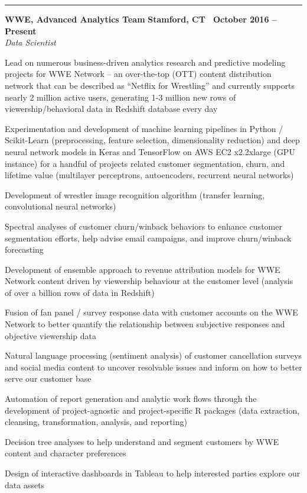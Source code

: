 \documentclass[10pt]{article}
\newcommand{\ressection}[1]{\noindent{\large\textbf{#1}}
\vspace{2pt}\hrule\vspace{4pt}}
\newcommand{\leftandright}[2]{\noindent\textbf{#1}\hfill
\textbf{#2}}
\begin{document}
\vspace{0.2cm}
\ressection{Work and Professional Research Experience}

\leftandright{WWE, Advanced Analytics Team}{Stamford, CT \textbullet\, October
2016 -- Present} \\  
\vspace{-0.8em}
\textit{Data Scientist} 
\begin{itemize*}
  \item Lead on numerous business-driven analytics research and
    predictive modeling projects for WWE Network -- an
    over-the-top (OTT) content distribution network  that can be
    described as ``Netflix for Wrestling'' and currently supports nearly
    2 million active users, generating 1-3 million new rows of viewership/behavioral 
    data in Redshift database every day
  \item Experimentation and development of machine learning pipelines
    in Python / Scikit-Learn (preprocessing, feature selection, dimensionality reduction) and 
    deep neural network models in Keras and TensorFlow 
    on AWS EC2 x2.2xlarge (GPU instance) for a handful of projects related customer segmentation, churn, 
    and lifetime value (multilayer perceptrons, autoencoders, recurrent
    neural networks) 
  \item  Development of wrestler image recognition algorithm (transfer learning,
    convolutional neural networks)
  \item  Spectral analyses of customer churn/winback behaviors 
    to enhance customer segmentation efforts, help advise email campaigns, and
    improve churn/winback forecasting 
  \item Development of ensemble approach to revenue attribution models for WWE Network content
    driven by viewership behaviour at the customer level (analysis of
    over a billion rows of data in Redshift)
  \item  Fusion of fan panel / survey response data with customer accounts on the
    WWE Network to better quantify the relationship between
    subjective responses and objective viewership data
  \item Natural language processing (sentiment analysis) of customer cancellation surveys
    and social media content to uncover resolvable issues and inform on
    how to better serve our customer base
  \item  Automation of report generation and analytic work flows
    through the development of project-agnostic and project-specific R packages 
    (data extraction, cleansing, transformation, analysis, and
    reporting)
  \item  Decision tree analyses to help understand and segment
    customers by WWE content and character preferences
  \item Design of interactive dashboards in Tableau to help interested
    parties explore our data assets
\end{itemize*}
\end{document}
